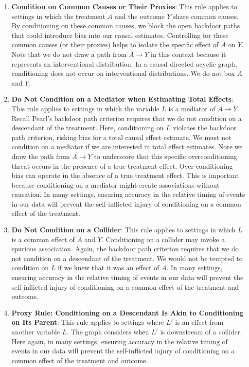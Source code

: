 \documentclass[
  single column]{article}
\begin{document}
\begin{enumerate}
\def\labelenumi{\arabic{enumi}.}
\setcounter{enumi}{1}
\item
  \textbf{Condition on Common Causes or Their Proxies}: This rule
  applies to settings in which the treatment \(A\) and the outcome \(Y\)
  share common causes. By conditioning on these common causes, we block
  the open backdoor paths that could introduce bias into our causal
  estimates. Controlling for these common causes (or their proxies)
  helps to isolate the specific effect of \(A\) on \(Y\). Note that we
  do not draw a path from \(A \to Y\) in this context because it
  represents an interventional distribution. In a causal directed
  acyclic graph, conditioning does not occur on interventional
  distributions. We do not box \(A\) and \(Y\).
\item
  \textbf{Do Not Condition on a Mediator when Estimating Total Effects}:
  This rule applies to settings in which the variable \(L\) is a
  mediator of \(A \to Y\). Recall Pearl's backdoor path criterion
  requires that we do not condition on a descendant of the treatment.
  Here, conditioning on \(L\) violates the backdoor path criterion,
  risking bias for a total causal effect estimate. We must not condition
  on a mediator if we are interested in total effect estimates. Note we
  draw the path from \(A \to Y\) to underscore that this specific
  overconditioning threat occurs in the presence of a true treatment
  effect. Over-conditioning bias can operate in the absence of a true
  treatment effect. This is important because conditioning on a mediator
  might create associations without causation. In many settings,
  ensuring accuracy in the relative timing of events in our data will
  prevent the self-inflicted injury of conditioning on a common effect
  of the treatment.
\item
  \textbf{Do Not Condition on a Collider}: This rule applies to settings
  in which \(L\) is a common effect of \(A\) and \(Y\). Conditioning on
  a collider may invoke a spurious association. Again, the backdoor path
  criterion requires that we do not condition on a descendant of the
  treatment. We would not be tempted to condition on \(L\) if we knew
  that it was an effect of \(A\). In many settings, ensuring accuracy in
  the relative timing of events in our data will prevent the
  self-inflicted injury of conditioning on a common effect of the
  treatment and outcome.
\item
  \textbf{Proxy Rule: Conditioning on a Descendant Is Akin to
  Conditioning on Its Parent}: This rule applies to settings where
  \(L'\) is an effect from another variable \(L\). The graph considers
  when \(L'\) is downstream of a collider. Here again, in many settings,
  ensuring accuracy in the relative timing of events in our data will
  prevent the self-inflicted injury of conditioning on a common effect
  of the treatment and outcome.
\end{enumerate}
\end{document}
